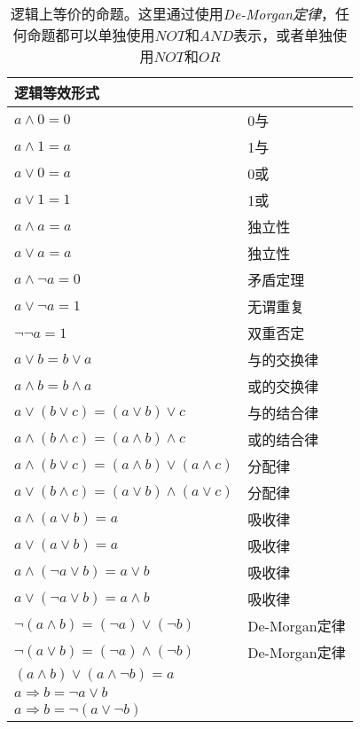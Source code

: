 \begin{table}
    \centering
    \caption[De-Morgan定律]{逻辑上等价的命题。这里通过使用\emph{De-Morgan定律}，任何命题都可以单独使用$NOT$和$AND$表示，或者单独使用$NOT$和$OR$}
    \label{tb:de_morgan_law}
    \begin{tabular}[\linewidth]{L{8cm}L{4cm}}
        \toprule
        \textbf{逻辑等效形式} & \\
        \toprule 
        $a\wedge0=0$ & 0与\\
        $a\wedge1=a$ & 1与\\
        $a\vee 0=a$ & 0或\\
        $a\vee 1=1$ & 1或\\
        \midrule 
        $a\wedge a=a$ & 独立性\\
        $a\vee a=a$ & 独立性\\
        $a\wedge \neg a=0$ & 矛盾定理\\
        $a\vee \neg a=1$ & 无谓重复\\
        $ \neg \neg a=1$ & 双重否定\\
        \midrule 
        $a\vee b=b\vee a$ & 与的交换律\\
        $a\wedge b=b\wedge a$ & 或的交换律\\
        $a\vee (b\vee c)=(a\vee b)\vee c$ & 与的结合律\\
        $a\wedge (b\wedge c)=(a\wedge b)\wedge c$ & 或的结合律\\
        $a\wedge (b\vee c)=(a\wedge b)\vee (a\wedge c)$ & 分配律\\
        $a\vee (b\wedge c)=(a\vee b)\wedge (a\vee c)$ & 分配律\\
        \midrule
        $a\wedge (a\vee b)=a$ & 吸收律\\
        $a\vee (a\vee b)=a$ & 吸收律\\
        $a\wedge (\neg a\vee b)=a\vee b$ & 吸收律\\
        $a\vee (\neg a\vee b)=a\wedge b$ & 吸收律\\
        \midrule
        $\neg(a\wedge b)=(\neg a)\vee (\neg b)$ & De-Morgan定律\\
        $\neg(a\vee b)=(\neg a)\wedge (\neg b)$ & De-Morgan定律\\
        $(a\wedge b)\vee(a\wedge \neg b)=a$ & \\
        $a\Longrightarrow b=\neg a \vee b$ & \\
        $a\Longrightarrow b=\neg (a \vee \neg b)$ & \\
        \bottomrule
    \end{tabular}
\end{table}





